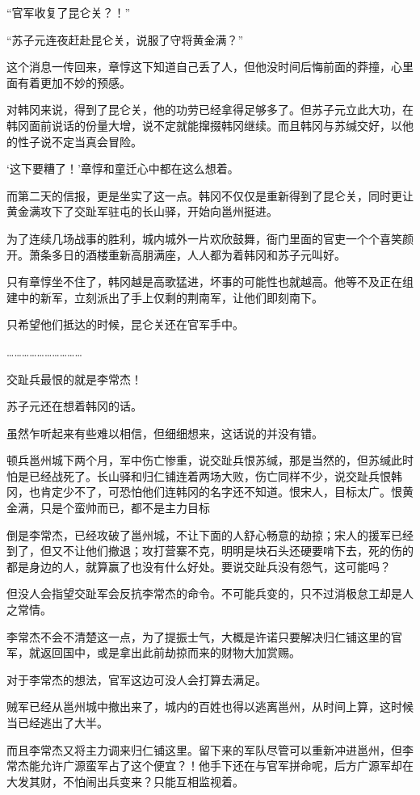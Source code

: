 “官军收复了昆仑关？！”

“苏子元连夜赶赴昆仑关，说服了守将黄金满？”

这个消息一传回来，章惇这下知道自己丢了人，但他没时间后悔前面的莽撞，心里面有着更加不妙的预感。

对韩冈来说，得到了昆仑关，他的功劳已经拿得足够多了。但苏子元立此大功，在韩冈面前说话的份量大增，说不定就能撺掇韩冈继续。而且韩冈与苏缄交好，以他的性子说不定当真会冒险。

‘这下要糟了！’章惇和童迁心中都在这么想着。

而第二天的信报，更是坐实了这一点。韩冈不仅仅是重新得到了昆仑关，同时更让黄金满攻下了交趾军驻屯的长山驿，开始向邕州挺进。

为了连续几场战事的胜利，城内城外一片欢欣鼓舞，衙门里面的官吏一个个喜笑颜开。萧条多日的酒楼重新高朋满座，人人都为着韩冈和苏子元叫好。

只有章惇坐不住了，韩冈越是高歌猛进，坏事的可能性也就越高。他等不及正在组建中的新军，立刻派出了手上仅剩的荆南军，让他们即刻南下。

只希望他们抵达的时候，昆仑关还在官军手中。

…………………………

交趾兵最恨的就是李常杰！

苏子元还在想着韩冈的话。

虽然乍听起来有些难以相信，但细细想来，这话说的并没有错。

顿兵邕州城下两个月，军中伤亡惨重，说交趾兵恨苏缄，那是当然的，但苏缄此时怕是已经战死了。长山驿和归仁铺连着两场大败，伤亡同样不少，说交趾兵恨韩冈，也肯定少不了，可恐怕他们连韩冈的名字还不知道。恨宋人，目标太广。恨黄金满，只是个蛮帅而已，都不是主力目标

倒是李常杰，已经攻破了邕州城，不让下面的人舒心畅意的劫掠；宋人的援军已经到了，但又不让他们撤退；攻打营寨不克，明明是块石头还硬要啃下去，死的伤的都是身边的人，就算赢了也没有什么好处。要说交趾兵没有怨气，这可能吗？

但没人会指望交趾军会反抗李常杰的命令。不可能兵变的，只不过消极怠工却是人之常情。

李常杰不会不清楚这一点，为了提振士气，大概是许诺只要解决归仁铺这里的官军，就返回国中，或是拿出此前劫掠而来的财物大加赏赐。

对于李常杰的想法，官军这边可没人会打算去满足。

贼军已经从邕州城中撤出来了，城内的百姓也得以逃离邕州，从时间上算，这时候当已经逃出了大半。

而且李常杰又将主力调来归仁铺这里。留下来的军队尽管可以重新冲进邕州，但李常杰能允许广源蛮军占了这个便宜？！他手下还在与官军拼命呢，后方广源军却在大发其财，不怕闹出兵变来？只能互相监视着。

